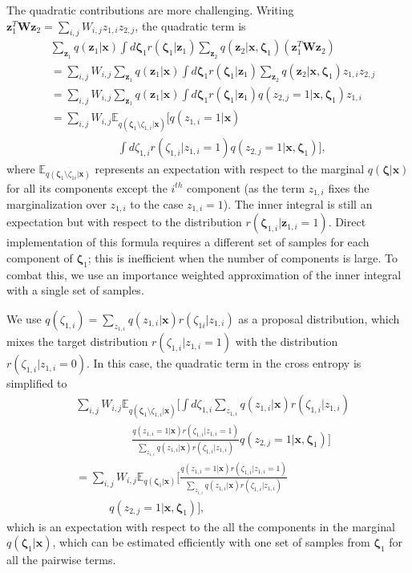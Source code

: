 \documentclass{article}
\newcommand{\x}{{\pmb{x}}}
\newcommand{\z}{{\pmb{z}}}
\newcommand{\W}{{\pmb{W}}}
\newcommand{\bzeta}{{\pmb{\zeta}}}
\newcommand{\E}{{\mathbb{E}}}
\begin{document}
The quadratic contributions are more challenging. Writing $\z_1^T \W \z_2 = \sum_{i,j} W_{i,j} z_{1,i} z_{2,j}$,
the quadratic term is
\begin{align*}
& \sum_{\z_1} q(\z_1|\x) \int d{\bzeta_1} r(\bzeta_1|\z_1) \sum_{\z_2} q(\z_2|\x, \bzeta_1) \left( \z_1^T \W \z_2 \right) \\
&= \sum_{i,j} W_{i,j} \sum_{\z_1} q(\z_1|\x) \! \int \!d{\bzeta_1} r(\bzeta_1|\z_1) \sum_{\z_2} q(\z_2|\x, \bzeta_1) z_{1,i} z_{2,j}  \\
&= \sum_{i,j} W_{i,j} \sum_{\z_1} q(\z_1|\x) \!\int \!d{\bzeta_1} r(\bzeta_1|\z_1) q( z_{2,j}=1|\x, \bzeta_1) z_{1,i}  \\
&= \sum_{i,j} W_{i,j} \E_{q(\bzeta_1\setminus\zeta_{1,i}|\x)} \Big[ q( z_{1,i}=1|\x)  \\
& \quad \quad \quad \quad \quad \quad  \int \!d{\zeta_{1,i}}  r(\zeta_{1,i}|z_{1,i}=1) q( z_{2,j}=1|\x, \bzeta_1) \Big],
 \end{align*}
where $\E_{q(\bzeta_1\setminus\zeta_{1i}|\x)}$ represents an expectation with respect to
the marginal $q(\bzeta|\x)$ for all its components except the $i^{th}$ component (as the term $z_{1,i}$ fixes the marginalization over $z_{1,i}$ to
the case $z_{1,i} = 1$). The inner integral is still an expectation but with respect to the  distribution $r(\bzeta_{1,i}|\z_{1,i}=1)$. Direct 
implementation of this formula requires a different set of samples for each component of $\bzeta_1$;
this is inefficient when the number of components is large. To combat this, we use an importance weighted approximation of the inner integral 
with a single set of samples.

We use $q(\zeta_{1,i}) = \sum_{z_{1,i}} q(z_{1,i}|\x)r(\zeta_{1i}|z_{1,i})$ as a proposal distribution,
which mixes the target distribution $r(\zeta_{1,i}|z_{1,i}=1)$ with the distribution $r(\zeta_{1,i}|z_{1,i}=0)$.
In this case, the quadratic term in the cross entropy is simplified to
\begin{align*}
& \sum_{i,j} W_{i,j} \E_{q(\bzeta_1\setminus\zeta_{1,i}|\x)} \Big[  \!\int \!d{\zeta_{1,i}} \sum_{z_{1,i}} q(z_{1,i}|\x)r(\zeta_{1,i}|z_{1,i})   \\
& \quad \quad \quad \quad \quad \frac{q( z_{1,i}=1|\x) r(\zeta_{1,i}|z_{1,i}=1)}{\sum_{z_{1,i}} q(z_{1,i}|\x)r(\zeta_{1,i}|z_{1,i})}
 q( z_{2,j}=1|\x, \bzeta_1) \Big] \\
 & = \sum_{i,j} W_{i,j} \E_{q(\bzeta_1|\x)} \Big[\frac{q( z_{1,i}=1|\x) r(\zeta_{1,i}|z_{1,i}=1)}{\sum_{z_{1,i}} q(z_{1,i}|\x)r(\zeta_{1,i}|z_{1,i})} \\
 & \quad \quad \quad q( z_{2,j}=1|\x, \bzeta_1)\Big],
 \end{align*}
which is an expectation with respect to the all the components in the marginal $q(\bzeta_1|\x)$,
which can be estimated efficiently with one set of samples from $\bzeta_1$ for all the pairwise terms.
\end{document}
